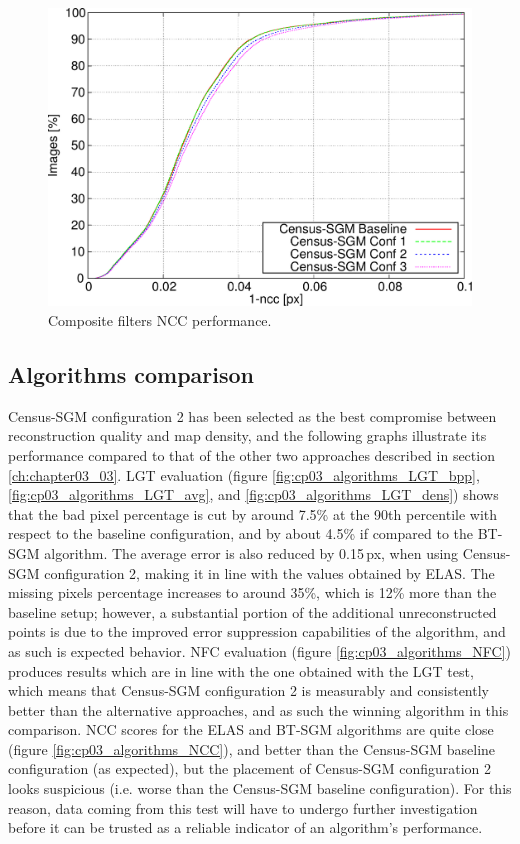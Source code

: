 \begin{figure}[h]
  \centering
  \includegraphics[width=\textwidth, trim=0 0 0 0,clip]{comp_ncc}
  \caption{ Composite filters NCC performance.}
  \label{fig:cp03_composite_NCC}
\end{figure}%

\subsection{Algorithms comparison}\label{ch:chapter03_04_03}

Census-SGM configuration 2 has been selected as the best compromise between reconstruction quality and map density, and the following graphs illustrate its performance compared to that of the other two approaches described in section \ref{ch:chapter03_03}. LGT evaluation (figure \ref{fig:cp03_algorithms_LGT_bpp}, \ref{fig:cp03_algorithms_LGT_avg}, and \ref{fig:cp03_algorithms_LGT_dens}) shows that the bad pixel percentage is cut by around 7.5\% at the 90th percentile with respect to the baseline configuration, and by about 4.5\% if compared to the BT-SGM algorithm. The average error is also reduced by 0.15\,px, when using Census-SGM configuration 2, making it in line with the values obtained by ELAS. The missing pixels percentage increases to around 35\%, which is 12\% more than the baseline setup; however, a substantial portion of the additional unreconstructed points is due to the improved error suppression capabilities of the algorithm, and as such is expected behavior.
NFC evaluation (figure \ref{fig:cp03_algorithms_NFC}) produces results which are in line with the one obtained with the LGT test, which means that Census-SGM configuration 2 is measurably and consistently better than the alternative approaches, and as such the winning algorithm in this comparison.
NCC scores for the ELAS and BT-SGM algorithms are quite close (figure \ref{fig:cp03_algorithms_NCC}), and better than the Census-SGM baseline configuration (as expected), but the placement of Census-SGM configuration 2 looks suspicious (i.e. worse than the Census-SGM baseline configuration). For this reason, data coming from this test will have to undergo further investigation before it can be trusted as a reliable indicator of an algorithm's performance.

